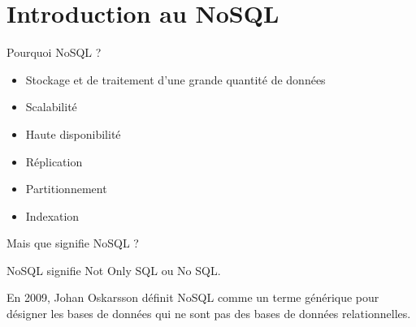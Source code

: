 \section{Introduction au NoSQL}

\begin{frame}{Pourquoi NoSQL ?}

    \begin{itemize}
        \item Stockage et de traitement d'une grande quantité de données
        \item Scalabilité
        \item Haute disponibilité
        \item Réplication
        \item Partitionnement
        \item Indexation
    \end{itemize}

\end{frame}

\begin{frame}{Mais que signifie NoSQL ?}

    \begin{definitionbox}
        NoSQL signifie Not Only SQL ou No SQL.
    \end{definitionbox}

    \pause

        En 2009, Johan Oskarsson définit NoSQL comme un terme générique pour désigner les bases de données qui ne sont pas des bases de données relationnelles.

\end{frame}

